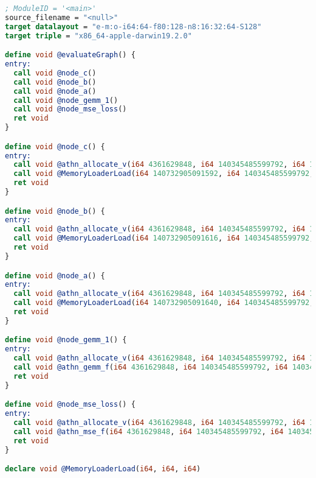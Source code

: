 \begin{lstlisting}[language=llvm,basicstyle=\small,caption=Пример LLVM IR]
; ModuleID = '<main>'
source_filename = "<null>"
target datalayout = "e-m:o-i64:64-f80:128-n8:16:32:64-S128"
target triple = "x86_64-apple-darwin19.2.0"

define void @evaluateGraph() {
entry:
  call void @node_c()
  call void @node_b()
  call void @node_a()
  call void @node_gemm_1()
  call void @node_mse_loss()
  ret void
}

define void @node_c() {
entry:
  call void @athn_allocate_v(i64 4361629848, i64 140345485599792, i64 140345485619416)
  call void @MemoryLoaderLoad(i64 140732905091592, i64 140345485599792, i64 140345485619416)
  ret void
}

define void @node_b() {
entry:
  call void @athn_allocate_v(i64 4361629848, i64 140345485599792, i64 140345485616152)
  call void @MemoryLoaderLoad(i64 140732905091616, i64 140345485599792, i64 140345485616152)
  ret void
}

define void @node_a() {
entry:
  call void @athn_allocate_v(i64 4361629848, i64 140345485599792, i64 140345485613576)
  call void @MemoryLoaderLoad(i64 140732905091640, i64 140345485599792, i64 140345485613576)
  ret void
}

define void @node_gemm_1() {
entry:
  call void @athn_allocate_v(i64 4361629848, i64 140345485599792, i64 140345485611632)
  call void @athn_gemm_f(i64 4361629848, i64 140345485599792, i64 140345485619376, i64 140345485613576, i64 140345485616152, i64 140345485611632)
  ret void
}

define void @node_mse_loss() {
entry:
  call void @athn_allocate_v(i64 4361629848, i64 140345485599792, i64 140345485620352)
  call void @athn_mse_f(i64 4361629848, i64 140345485599792, i64 140345485611632, i64 140345485619416, i64 140345485620352)
  ret void
}

declare void @MemoryLoaderLoad(i64, i64, i64)


\end{lstlisting}

